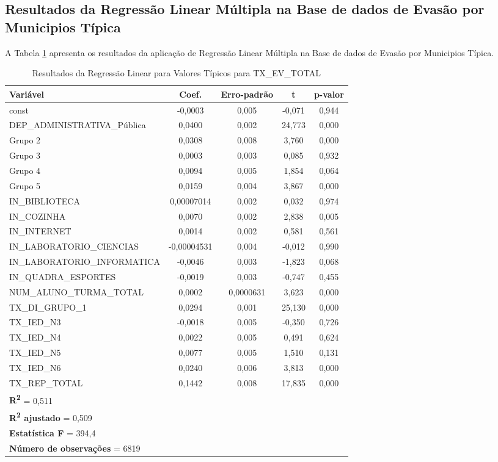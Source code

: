 \documentclass[english, spanish, brazilian]{RBIEarticle} %
\begin{document}
\subsection{Resultados da Regressão Linear Múltipla na Base de dados de Evasão por Municipios Típica}

A Tabela \ref{tab:reg_tipicos_tx_ev} apresenta os resultados da aplicação de Regressão Linear Múltipla na Base de dados de Evasão por Municipios Típica.

\begin{table}[H]
\centering
\caption{Resultados da Regressão Linear para Valores Típicos para TX\_EV\_TOTAL}
\label{tab:reg_tipicos_tx_ev}
\begin{tabular}{lcccc}
\hline
\textbf{Variável} & \textbf{Coef.} & \textbf{Erro-padrão} & \textbf{t} & \textbf{p-valor} \\
\hline
const & -0,0003 & 0,005 & -0,071 & 0,944 \\
DEP\_ADMINISTRATIVA\_Pública & 0,0400 & 0,002 & 24,773 & 0,000 \\
Grupo 2 & 0,0308 & 0,008 & 3,760 & 0,000 \\
Grupo 3 & 0,0003 & 0,003 & 0,085 & 0,932 \\
Grupo 4 & 0,0094 & 0,005 & 1,854 & 0,064 \\
Grupo 5 & 0,0159 & 0,004 & 3,867 & 0,000 \\
IN\_BIBLIOTECA & 0,00007014 & 0,002 & 0,032 & 0,974 \\
IN\_COZINHA & 0,0070 & 0,002 & 2,838 & 0,005 \\
IN\_INTERNET & 0,0014 & 0,002 & 0,581 & 0,561 \\
IN\_LABORATORIO\_CIENCIAS & -0,00004531 & 0,004 & -0,012 & 0,990 \\
IN\_LABORATORIO\_INFORMATICA & -0,0046 & 0,003 & -1,823 & 0,068 \\
IN\_QUADRA\_ESPORTES & -0,0019 & 0,003 & -0,747 & 0,455 \\
NUM\_ALUNO\_TURMA\_TOTAL & 0,0002 & 0,0000631 & 3,623 & 0,000 \\
TX\_DI\_GRUPO\_1 & 0,0294 & 0,001 & 25,130 & 0,000 \\
TX\_IED\_N3 & -0,0018 & 0,005 & -0,350 & 0,726 \\
TX\_IED\_N4 & 0,0022 & 0,005 & 0,491 & 0,624 \\
TX\_IED\_N5 & 0,0077 & 0,005 & 1,510 & 0,131 \\
TX\_IED\_N6 & 0,0240 & 0,006 & 3,813 & 0,000 \\
TX\_REP\_TOTAL & 0,1442 & 0,008 & 17,835 & 0,000 \\
\hline
\multicolumn{5}{l}{\textbf{R\textsuperscript{2}} = 0,511} \\
\multicolumn{5}{l}{\textbf{R\textsuperscript{2} ajustado} = 0,509} \\
\multicolumn{5}{l}{\textbf{Estatística F} = 394,4} \\
\multicolumn{5}{l}{\textbf{Número de observações} = 6819} \\
\hline
\end{tabular}
\end{table}
\end{document}

